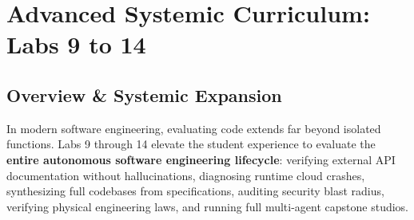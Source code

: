 \documentclass[12pt, a4paper]{report}
\begin{document}
\chapter{Advanced Systemic Curriculum: Labs 9 to 14}

\section{Overview \& Systemic Expansion}
In modern software engineering, evaluating code extends far beyond isolated functions. Labs 9 through 14 elevate the student experience to evaluate the \textbf{entire autonomous software engineering lifecycle}: verifying external API documentation without hallucinations, diagnosing runtime cloud crashes, synthesizing full codebases from specifications, auditing security blast radius, verifying physical engineering laws, and running full multi-agent capstone studios.
\end{document}
